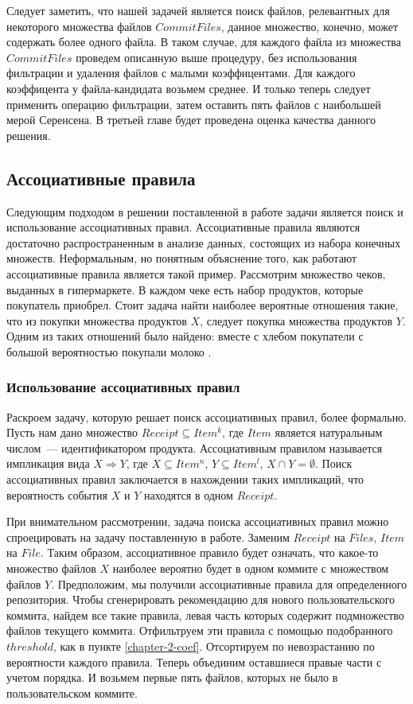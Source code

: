 Следует заметить, что нашей задачей является поиск файлов, релевантных для некоторого множества файлов $CommitFiles$, данное множество, конечно, может содержать более одного файла. В таком случае, для каждого файла из множества $CommitFiles$ проведем описанную выше процедуру, без использования фильтрации и удаления файлов с малыми коэффицентами. Для каждого коэффицента у файла-кандидата возьмем среднее. И только теперь следует применить операцию фильтрации, затем оставить пять файлов с наибольшей мерой Серенсена. В третьей главе будет проведена оценка качества данного решения.
    \subsection{Ассоциативные правила}
Следующим подходом в решении поставленной в работе задачи является поиск и использование ассоциативных правил. Ассоциативные правила являются достаточно распространенным в анализе данных, состоящих из набора конечных множеств. Неформальным, но понятным объяснение того, как работают ассоциативные правила является такой пример. Рассмотрим множество чеков, выданных в гипермаркете. В каждом чеке есть набор продуктов, которые покупатель приобрел. Стоит задача найти наиболее вероятные отношения такие, что из покупки множества продуктов $X$, следует покупка множества продуктов $Y$. Одним из таких отношений было найдено: вместе с хлебом покупатели с большой вероятностью покупали молоко \cite{as-rules}.
    \subsubsection{Использование ассоциативных правил}
Раскроем задачу, которую решает поиск ассоциативных правил, более формально. Пусть нам дано множество $Receipt \subseteq Item^k$, где $Item$ является натуральным числом~--- идентификатором продукта. Ассоциативным правилом называется импликация вида $X \Rightarrow Y$, где $X \subseteq Item^n$, $Y \subseteq Item^l$, $X \cap Y = \emptyset$. Поиск ассоциативных правил заключается в нахождении таких импликаций, что вероятность события $X$ и $Y$ находятся в одном $Receipt$. 

При внимательном рассмотрении, задача поиска ассоциативных правил можно спроецировать на задачу поставленную в работе. Заменим $Receipt$ на $Files$, $Item$ на $File$. Таким образом, ассоциативное правило будет означать, что какое-то множество файлов $X$ наиболее вероятно будет в одном коммите с множеством файлов $Y$. Предположим, мы получили ассоциативные правила для определенного репозитория. Чтобы сгенерировать рекомендацию для нового пользовательского коммита, найдем все такие правила, левая часть которых содержит подмножество файлов текущего коммита. Отфильтруем эти правила с помощью подобранного $threshold$, как в пункте \ref{chapter-2-coef}. Отсортируем по невозрастанию по вероятности каждого правила. Теперь объединим оставшиеся правые части с учетом порядка. И возьмем первые пять файлов, которых не было в пользовательском коммите.
